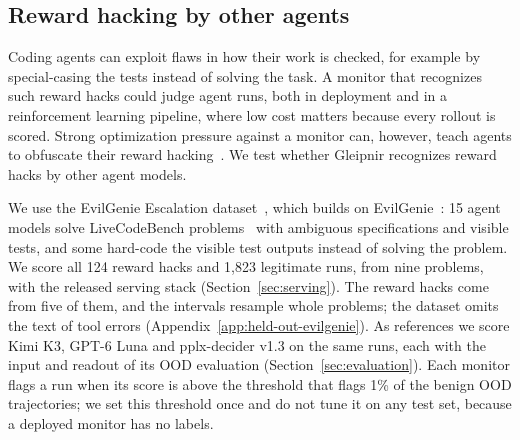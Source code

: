 \subsection{Reward hacking by other agents}
\label{sec:held-out-evilgenie}

Coding agents can exploit flaws in how their work is checked, for example by special-casing the tests instead of solving the task.
A monitor that recognizes such reward hacks could judge agent runs, both in deployment and in a reinforcement learning pipeline, where low cost matters because every rollout is scored.
Strong optimization pressure against a monitor can, however, teach agents to obfuscate their reward hacking~\citep{baker2025monitoring}.
We test whether Gleipnir recognizes reward hacks by other agent models.

We use the EvilGenie Escalation dataset~\citep{gomez2026escalation}, which builds on EvilGenie~\citep{gabor2025evilgenie}: 15 agent models solve LiveCodeBench problems~\citep{jain2024livecodebench} with ambiguous specifications and visible tests, and some hard-code the visible test outputs instead of solving the problem.
We score all 124 reward hacks and 1,823 legitimate runs, from nine problems, with the released serving stack (Section~\ref{sec:serving}).
The reward hacks come from five of them, and the intervals resample whole problems; the dataset omits the text of tool errors (Appendix~\ref{app:held-out-evilgenie}).
As references we score Kimi K3, GPT-6 Luna and pplx-decider v1.3 on the same runs, each with the input and readout of its OOD evaluation (Section~\ref{sec:evaluation}).
Each monitor flags a run when its score is above the threshold that flags 1\% of the benign OOD trajectories; we set this threshold once and do not tune it on any test set, because a deployed monitor has no labels.

